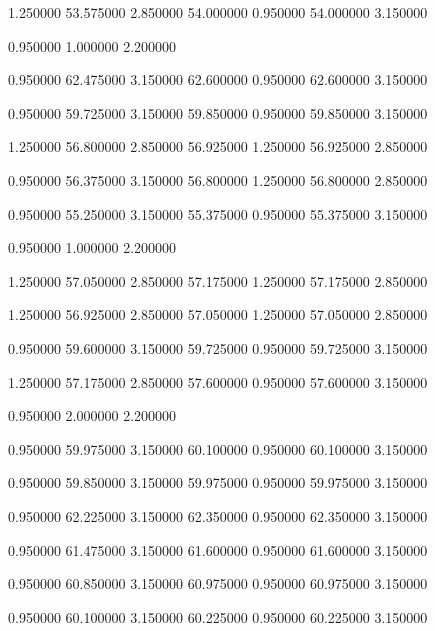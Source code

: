  {1.250000} {53.575000} {2.850000} {54.000000} {0.950000} {54.000000} {3.150000}

 {0.950000} {1.000000} {2.200000}

 {0.950000} {62.475000} {3.150000} {62.600000} {0.950000} {62.600000} {3.150000}

 {0.950000} {59.725000} {3.150000} {59.850000} {0.950000} {59.850000} {3.150000}

 {1.250000} {56.800000} {2.850000} {56.925000} {1.250000} {56.925000} {2.850000}

 {0.950000} {56.375000} {3.150000} {56.800000} {1.250000} {56.800000} {2.850000}

 {0.950000} {55.250000} {3.150000} {55.375000} {0.950000} {55.375000} {3.150000}

 {0.950000} {1.000000} {2.200000}

 {1.250000} {57.050000} {2.850000} {57.175000} {1.250000} {57.175000} {2.850000}

 {1.250000} {56.925000} {2.850000} {57.050000} {1.250000} {57.050000} {2.850000}

 {0.950000} {59.600000} {3.150000} {59.725000} {0.950000} {59.725000} {3.150000}

 {1.250000} {57.175000} {2.850000} {57.600000} {0.950000} {57.600000} {3.150000}

 {0.950000} {2.000000} {2.200000}

 {0.950000} {59.975000} {3.150000} {60.100000} {0.950000} {60.100000} {3.150000}

 {0.950000} {59.850000} {3.150000} {59.975000} {0.950000} {59.975000} {3.150000}

 {0.950000} {62.225000} {3.150000} {62.350000} {0.950000} {62.350000} {3.150000}

 {0.950000} {61.475000} {3.150000} {61.600000} {0.950000} {61.600000} {3.150000}

 {0.950000} {60.850000} {3.150000} {60.975000} {0.950000} {60.975000} {3.150000}

 {0.950000} {60.100000} {3.150000} {60.225000} {0.950000} {60.225000} {3.150000}

